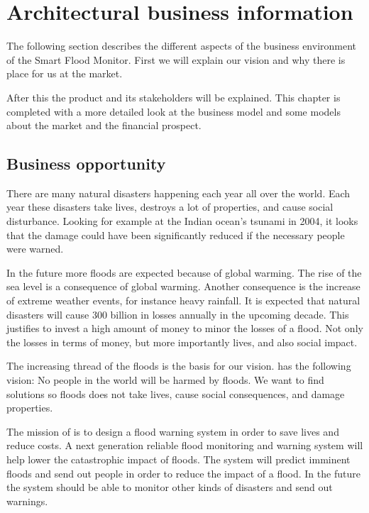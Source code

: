 
\clearpage
\chapter{Architectural business information}
\label{ch:business}
The following section describes the different aspects of the business environment of the Smart Flood Monitor. First we will explain our vision and why there is place for us at the market.
 
After this the product and its stakeholders will be explained. This chapter is completed with a more detailed look at the business model and some models about the market and the financial prospect.

\section{Business opportunity}
There are many natural disasters happening each year all over the world. Each year these disasters take lives, destroys a lot of properties, and cause social disturbance.
Looking for example at the Indian ocean's tsunami in 2004, it looks that the damage could have been significantly reduced if the necessary people were warned\cite{tsunami10ylater, tsunamiwarnsavelives}.  %

In the future more floods are expected because of global warming\cite{climateincrease}. The rise of the sea level is a consequence of global warming. Another consequence is the increase of extreme weather events, for instance heavy rainfall. It is expected that natural disasters will cause 300 billion in losses annually in the upcoming decade\cite{disastercosts}. This justifies to invest a high amount of money to minor the losses of a flood. Not only the losses in terms of money, but more importantly lives, and also social impact.

The increasing thread of the floods is the basis for our vision. \CompanyName has the following vision: No people in the world will be harmed by floods. We want to find solutions so floods does not take lives, cause social consequences, and damage properties.   

The mission of \CompanyName is to design a flood warning system in order to save lives and reduce costs. A next generation reliable flood monitoring and warning system will help lower the catastrophic impact of floods. The system will predict imminent floods and send out people in order to reduce the impact of a flood. In the future the system should be able to monitor other kinds of disasters and send out warnings. 

